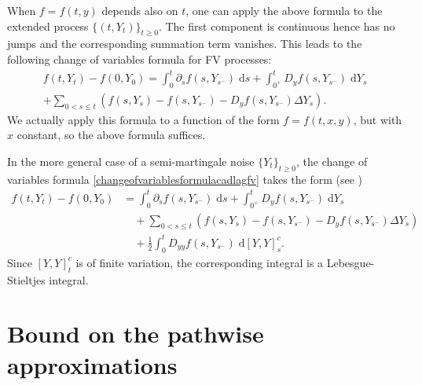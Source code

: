 \documentclass[reqno,12pt]{amsart}
\theoremstyle{plain} %
\theoremstyle{definition} %
\begin{document}
When $f=f(t, y)$ depends also on $t$, one can apply the above formula to the extended process $\{(t, Y_t)\}_{t\geq 0}$. The first component is continuous hence has no jumps and the corresponding summation term vanishes. This leads to the following change of variables formula for FV processes:
\begin{multline}
    \label{changeofvariablesformulacadlagfv}
    f(t, Y_t) - f(0, Y_0) = \int_0^t \partial_s f(s, Y_{s^-})\;\mathrm{d}s + \int_{0^+}^t D_y f(s, Y_{s^-}) \;\mathrm{d}Y_s \\
    + \sum_{0 < s \leq t} \left( f(s, Y_s) - f(s, Y_{s^{-}}) - D_y f(s, Y_{s^-})\Delta Y_s\right).
\end{multline}
We actually apply this formula to a function of the form $f=f(t, x, y)$, but with $x$ constant, so the above formula suffices.

In the more general case of a semi-martingale noise $\{Y_t\}_{t\geq 0}$, the change of variables formula \eqref{changeofvariablesformulacadlagfv} takes the form (see \cite[Theorems II.32 and II.33]{Protter2005})
\begin{equation}
    \label{changeofvariablesformulasemimartingale}
    \begin{aligned}
        f(t, Y_t) - f(0, Y_0) & = \int_0^t \partial_s f(s, Y_{s^-})\;\mathrm{d}s + \int_{0^+}^t D_y f(s, Y_{s^-}) \;\mathrm{d}Y_s \\
        & \quad + \sum_{0 < s \leq t} \left( f(s, Y_s) - f(s, Y_{s^{-}}) - D_y f(s, Y_{s^-})\Delta Y_s\right) \\
        & \quad + \frac{1}{2}\int_0^t D_{yy}f(s, Y_{s^-})\;\mathrm{d}[Y, Y]_s^c.
    \end{aligned}
\end{equation}
Since $[Y, Y]_t^c$ is of finite variation, the corresponding integral is a Lebesgue-Stieltjes integral.

\section{Bound on the pathwise approximations}
\label{secpathwiseapproximation}
\end{document}
